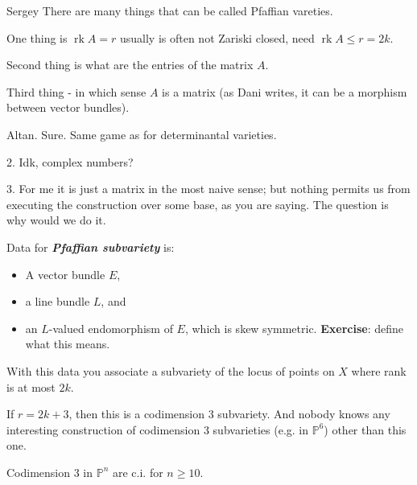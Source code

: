 \begin{thing4}{Sergey}\leavevmode
	There are many things that can be called Pfaffian vareties.

	One thing is $\operatorname{rk} A = r$ usually is often not Zariski closed, need $\operatorname{rk} A \leq  r = 2k$.

Second thing is what are the entries of the matrix $A$.

Third thing - in which sense $A$ is a matrix (as Dani writes, it can be a morphism between vector bundles).
\end{thing4}

\begin{thing3}{Altan}. Sure.  Same game as for determinantal varieties.

2. Idk, complex numbers?

3. For me it is just a matrix in the most naive sense; but nothing permits us from executing the construction over some base, as you are saying.  The question is why would we do it.
\end{thing3}

 \begin{defn}[Sergey]\leavevmode
 	Data for \textit{\textbf{Pfaffian subvariety}} is:
	\begin{itemize}
	\item A vector bundle $E$,
	\item a line bundle $ L$, and
	\item an $L$-valued endomorphism of $E$, which is skew symmetric. {\color{4}\textbf{Exercise}: define what this means.}
	\end{itemize}
	With this data you associate a subvariety of the locus of points on $ X$ where rank is at most $2k$.
 \end{defn}

 \begin{example}\leavevmode
 	If  $r=2k+3$, then this is a codimension 3 subvariety. And nobody knows any interesting construction of codimension 3 subvarieties (e.g. in $\mathbb{P}^6$) other than this one.
 \end{example}

 \begin{conjecture}[Hartshorne]
 	Codimension 3 in $\mathbb{P}^n$ are c.i. for $n\geq 10$.
\end{conjecture}

